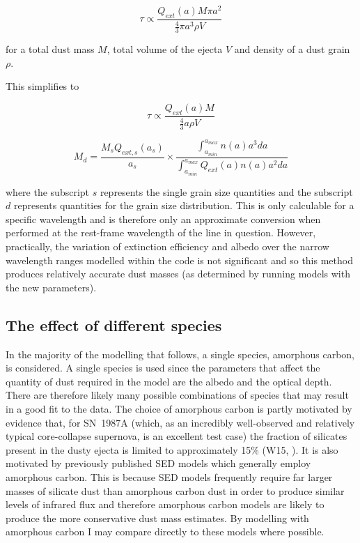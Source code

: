 \begin{equation}
\tau \propto \frac{Q_{ext}(a) M \pi a^2}{\frac{4}{3} \pi a^3 \rho V}
\end{equation}

\noindent for a total dust mass $M$, total volume of the ejecta $V$ and density of a dust grain $\rho$.

This simplifies to 

\begin{equation}
\tau \propto \frac{Q_{ext}(a) M}{\frac{4}{3} a \rho V}
\end{equation}

\begin{equation}
\label{distn_conv}
M_{d}= \frac{M_s Q_{ext,s}(a_s)}{a_s} \times \frac{\int^{a_{max}}_{a_{min}} n(a) a^3 da}{\int^{a_{max}}_{a_{min}} Q_{ext}(a) n(a) a^2 da}
\end{equation}

where the subscript $s$ represents the single grain size quantities and the subscript  $d$ represents quantities for the grain size distribution.  This is only calculable for a specific wavelength and is therefore only an approximate conversion when performed at the rest-frame wavelength of the line in question.  However, practically, the variation of extinction efficiency and albedo over the narrow wavelength ranges modelled within the code is not significant and so this method produces relatively accurate dust masses (as determined by running models with the new parameters).

\subsection{The effect of different species}

In the majority of the modelling that follows, a single species, amorphous carbon, is considered.   A single species is used since the parameters that affect the quantity of dust required in the model are the albedo and the optical depth.  There are therefore  likely many possible combinations of species that may result in a good fit to the data.  The choice of amorphous carbon is partly motivated by evidence that, for SN~1987A (which, as an incredibly well-observed and relatively typical core-collapse supernova, is an excellent test case) the fraction of silicates present in the dusty ejecta is limited to approximately 15\% (W15, \citet{Ercolano2007}).  It is also motivated by previously published SED models which generally employ amorphous carbon.  This is because SED models frequently require far larger masses of silicate dust than amorphous carbon dust in order to produce similar levels of infrared flux and therefore amorphous carbon models are likely to produce the more conservative dust mass estimates.  By modelling with amorphous carbon I may compare directly to these models where possible.

